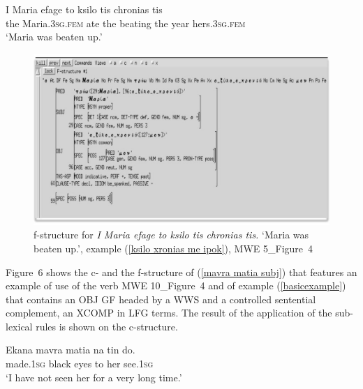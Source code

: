 \documentclass[output=paper,
modfonts
]{langscibook}
\begin{document}
 \ea\label{ksilo xronias me ipok}
\gll	I Maria     efage to   ksilo      tis          chronias    tis \\
the Maria.\textsc{3sg}.\textsc{fem} ate the beating the year hers.\textsc{3sg}.\textsc{fem} \\
\glt `Maria was beaten up.’
\z

\begin{figure}[h!]
 \caption{f-structure for \textit{I Maria efage to ksilo tis chronias tis.} `Maria was beaten up.', example (\ref{ksilo xronias me ipok}), MWE 5\_Figure~4}
 \centering
 \includegraphics[width=1\textwidth]{figures/example9a}
 \end{figure}


Figure~6 shows the c- and the f-structure of (\ref{mavra matia subj}) that features an example of use of the verb MWE 10\_Figure~4 and of example (\ref{basicexample}) that  contains an OBJ GF headed by a WWS and a controlled sentential complement, an XCOMP in LFG terms. The result of the application of the sub-lexical rules is shown on the c-structure. 

 \ea\label{mavra matia subj}
\gll Ekana           mavra    matia    na  tin   do.\\ 
made.\textsc{1sg}   black      eyes      to  her see.\textsc{1sg}\\
\glt `I have not seen her for a very long time.’
\z
 
\end{document}
